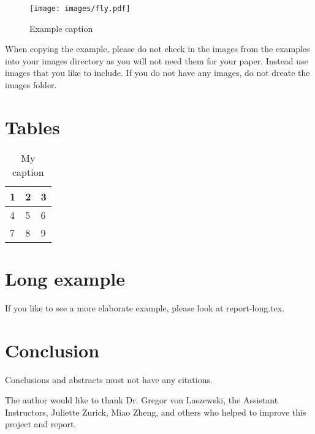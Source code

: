 \documentclass[sigconf]{acmart}
\begin{document}
\begin{figure}[!ht]
  \centering\texttt{[image: images/fly.pdf]}
  \caption{Example caption}\label{f:fly}
\end{figure}

When copying the example, please do not check in the images from the
examples into your images directory as you will not need them for your
paper. Instead use images that you like to include. If you do not have
any images, do not dreate the images folder.





\section{Tables}





\begin{table}[htb]
\centering
\caption{My caption}
\label{t:mytabble}
\begin{tabular}{lll}
1 & 2 & 3 \\
\hline
4 & 5 & 6 \\
7 & 8 & 9
\end{tabular}
\end{table}

\section{Long example}

If you like to see a more elaborate example, please look at
report-long.tex. 

\section{Conclusion}

Conclusions and abstracts must not have any citations.

\begin{acks}

  The author would like to thank Dr. Gregor von Laszewski, 
  the Assistant Instructors, Juliette Zurick, Miao Zheng,
  and others who helped to improve this project and report.

\end{acks}
\end{document}
